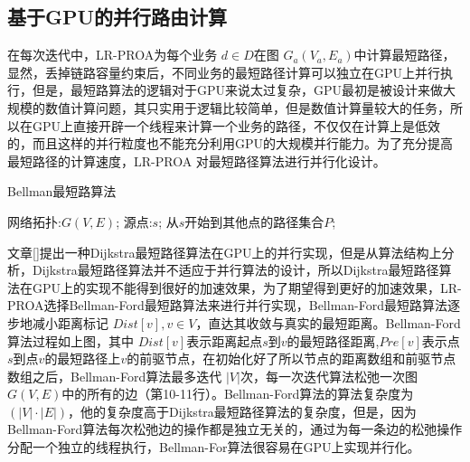 \subsection{基于GPU的并行路由计算}
  在每次迭代中，LR-PROA为每个业务 $d \in D$在图 $G_a(V_a, E_a)$中计算最短路径，显然，丢掉链路容量约束后，不同业务的最短路径计算可以独立在GPU上并行执行，但是，最短路算法的逻辑对于GPU来说太过复杂，GPU最初是被设计来做大规模的数值计算问题，其只实用于逻辑比较简单，但是数值计算量较大的任务，所以在GPU上直接开辟一个线程来计算一个业务的路径，不仅仅在计算上是低效的，而且这样的并行粒度也不能充分利用GPU的大规模并行能力。为了充分提高最短路径的计算速度，LR-PROA 对最短路径算法进行并行化设计。
\begin{algorithm}[htb] 
\caption{{Bellman最短路算法}}
\label{Bellman}
\begin{algorithmic}[1] 
\Require 
网络拓扑:$G(V, E)$;
源点:$s$;
\Ensure 
从$s$开始到其他点的路径集合$P$;
\EndFor
{}
\EndIf
\EndFor
\EndWhile
{}
\end{algorithmic}
\end{algorithm}
  文章[]提出一种Dijkstra最短路径算法在GPU上的并行实现，但是从算法结构上分析，Dijkstra最短路径算法并不适应于并行算法的设计，所以Dijkstra最短路径算法在GPU上的实现不能得到很好的加速效果，为了期望得到更好的加速效果，LR-PROA选择Bellman-Ford最短路算法来进行并行实现，Bellman-Ford最短路算法逐步地减小距离标记 $Dist[v],v\in V$，直达其收敛与真实的最短距离。Bellman-Ford算法过程如上图，其中 $Dist[v]$表示距离起点$s$到$v$的最短路径距离,$Pre[v]$表示点$s$到点$v$的最短路径上$v$的前驱节点，在初始化好了所以节点的距离数组和前驱节点数组之后，Bellman-Ford算法最多迭代 $|V|$次，每一次迭代算法松弛一次图$G(V, E)$中的所有的边（第10-11行）。Bellman-Ford算法的算法复杂度为$(|V|\cdot |E|)$，他的复杂度高于Dijkstra最短路径算法的复杂度，但是，因为Bellman-Ford算法每次松弛边的操作都是独立无关的，通过为每一条边的松弛操作分配一个独立的线程执行，Bellman-For算法很容易在GPU上实现并行化。
